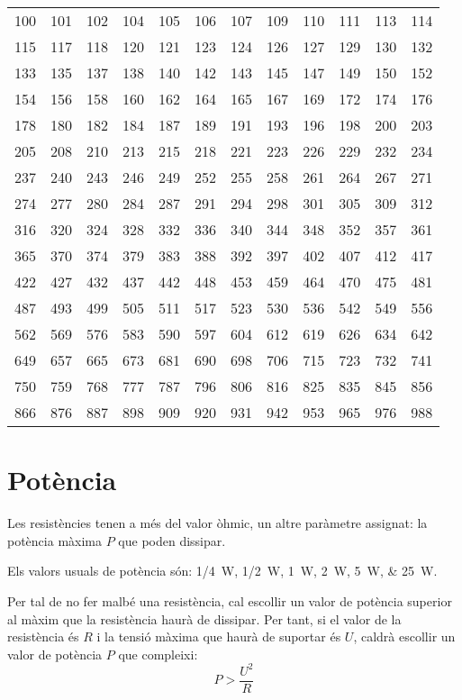 \begin{center}
   \begin{tabular}{cccccccccccc}
   \toprule[1pt]
   100 & 101 & 102 & 104 & 105 & 106 & 107 & 109 & 110 & 111 & 113 & 114 \\
   115 & 117 & 118 & 120 & 121 & 123 & 124 & 126 & 127 & 129 & 130 & 132 \\
   133 & 135 & 137 & 138 & 140 & 142 & 143 & 145 & 147 & 149 & 150 & 152 \\
   154 & 156 & 158 & 160 & 162 & 164 & 165 & 167 & 169 & 172 & 174 & 176 \\
   178 & 180 & 182 & 184 & 187 & 189 & 191 & 193 & 196 & 198 & 200 & 203 \\
   205 & 208 & 210 & 213 & 215 & 218 & 221 & 223 & 226 & 229 & 232 & 234 \\
   237 & 240 & 243 & 246 & 249 & 252 & 255 & 258 & 261 & 264 & 267 & 271 \\
   274 & 277 & 280 & 284 & 287 & 291 & 294 & 298 & 301 & 305 & 309 & 312 \\
   316 & 320 & 324 & 328 & 332 & 336 & 340 & 344 & 348 & 352 & 357 & 361 \\
   365 & 370 & 374 & 379 & 383 & 388 & 392 & 397 & 402 & 407 & 412 & 417 \\
   422 & 427 & 432 & 437 & 442 & 448 & 453 & 459 & 464 & 470 & 475 & 481 \\
   487 & 493 & 499 & 505 & 511 & 517 & 523 & 530 & 536 & 542 & 549 & 556 \\
   562 & 569 & 576 & 583 & 590 & 597 & 604 & 612 & 619 & 626 & 634 & 642 \\
   649 & 657 & 665 & 673 & 681 & 690 & 698 & 706 & 715 & 723 & 732 & 741 \\
   750 & 759 & 768 & 777 & 787 & 796 & 806 & 816 & 825 & 835 & 845 & 856 \\
   866 & 876 & 887 & 898 & 909 & 920 & 931 & 942 & 953 & 965 & 976 & 988 \\
   \bottomrule[1pt]
   \end{tabular}
\end{center}


\section{Potència} \label{sec:resist-pot}

Les resistències tenen a més del valor òhmic, un altre paràmetre assignat: la potència màxima $P$ que poden dissipar.

Els valors usuals de potència són: \SIlist{1/4;1/2;1;2;5;25}{W}.

Per tal de no fer malbé una resistència, cal escollir un valor de potència superior al màxim que la resistència haurà de dissipar. Per tant, si el valor de la resistència és $R$ i la tensió màxima que haurà de suportar és $U$, caldrà escollir un valor de potència $P$ que compleixi:
\begin{equation}
  P > \frac{U^2}{R}
\end{equation}

